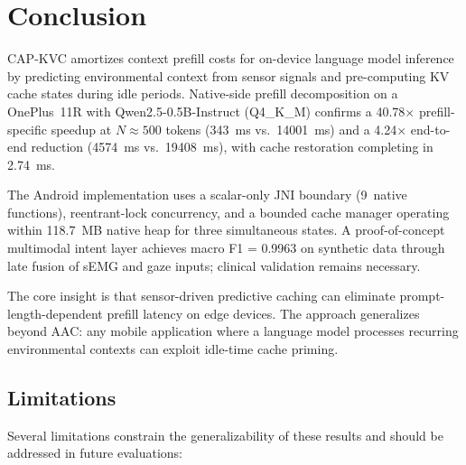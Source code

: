 \documentclass[journal]{IEEEtran}
\begin{document}
\section{Conclusion}
\label{sec:conclusion}

CAP-KVC amortizes context prefill costs for on-device language model inference by predicting environmental context from sensor signals and pre-computing KV cache states during idle periods. Native-side prefill decomposition on a OnePlus~11R with Qwen2.5-0.5B-Instruct (Q4\_K\_M) confirms a 40.78$\times$ prefill-specific speedup at $N \approx 500$ tokens (343~ms vs.\ 14001~ms) and a 4.24$\times$ end-to-end reduction (4574~ms vs.\ 19408~ms), with cache restoration completing in 2.74~ms.

The Android implementation uses a scalar-only JNI boundary (9~native functions), reentrant-lock concurrency, and a bounded cache manager operating within 118.7~MB native heap for three simultaneous states. A proof-of-concept multimodal intent layer achieves macro F1 = 0.9963 on synthetic data through late fusion of sEMG and gaze inputs; clinical validation remains necessary.

The core insight is that sensor-driven predictive caching can eliminate prompt-length-dependent prefill latency on edge devices. The approach generalizes beyond AAC: any mobile application where a language model processes recurring environmental contexts can exploit idle-time cache priming.

\subsection{Limitations}

Several limitations constrain the generalizability of these results and should be addressed in future evaluations:
\end{document}
